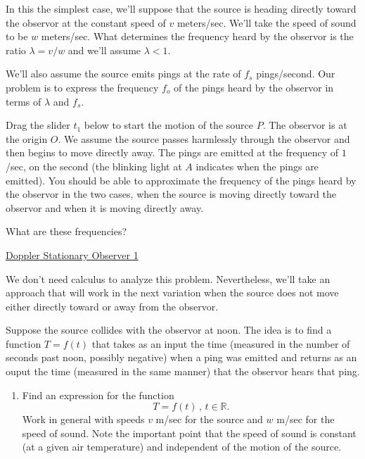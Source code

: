 \documentclass{ximera}
\begin{document}
\begin{example} \label{Exkdfksadfsdt4e4}

In this the simplest case, we'll suppose that the source is heading directly toward the observor at the constant speed of $v$ meters/sec. We'll take the speed of sound to be $w$ meters/sec. What determines the frequency heard by the observor is the ratio $\lambda = v/w$ and we'll assume $\lambda < 1$. 

We'll also assume the source emits pings at the rate of $f_s$ pings/second. Our problem is to express the frequency $f_o$ of the pings heard by the observor in terms of $\lambda$ and $f_s$.

Drag the slider $t_1$ below to start the motion of the source $P$. The observor is at the origin $O$. We assume the source passes harmlessly through the observor and then begins to move directly away. The pings are emitted at the frequency of $1$/sec, on the second (the blinking light at $A$ indicates when the pings are emitted). You should be able to approximate the frequency of the pings heard by the observor in the two cases, when the source is moving directly toward the observor and when it is moving directly away. 

What are these frequencies?
\begin{freeResponse}
\end{freeResponse}


\begin{onlineOnly}
    \begin{center}
\end{center}
\end{onlineOnly}

\href{https://www.desmos.com/calculator/h2rw1sr8li}{Doppler Stationary Observer 1}

We don't need calculus to analyze this problem. Nevertheless, we'll take an approach that will work in the next variation when the source does not move either directly toward or away from the observor.

Suppose the source collides with the observor at noon. The idea is to find a function $T=f(t)$ that takes as an input the time (measured in the number of seconds past noon, possibly negative) when a ping was emitted and returns as an ouput the time (measured in the same manner) that the observor hears that ping.

\begin{enumerate}
\item Find an expression for the function 
\[
    T = f(t) \, , \, t \in \mathbb{R}.
\]
Work in general with speeds $v$ m/sec for the source and $w$ m/sec for the speed of sound. Note the important point that the speed of sound is constant (at a given air temperature) and independent of the motion of the source.


\end{enumerate}
\end{example}
\end{document}
